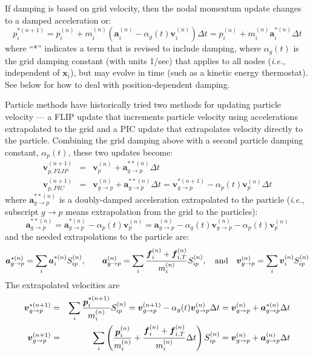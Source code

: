 \documentclass[11pt]{article}
\renewcommand{\vec}[1]{\boldsymbol{#1}}
\begin{document}
If damping is based on grid velocity, then the nodal momentum update changes to a damped acceleration or:
\begin{equation}
     p_i^{*(n+1)} = p_i^{(n)} +  m_i^{(n)}(\vec a_i^{(n)}-\alpha_g(t)\vec v_i^{(n)})\Delta t = p_i^{(n)} +  m_i^{(n)}\vec a_i^{*(n)}\Delta t
\end{equation}
where ``*'' indicates a term that is revised to include damping,
where $\alpha_g(t)$ is the grid damping constant (with units 1/sec) that applies to all nodes (\emph{i.e.}, independent of $\vec x_i$), but may evolve in time (such as a kinetic energy thermostat). See below for how to deal with position-dependent damping.

Particle methods have historically tried two methods for updating particle velocity --- a FLIP update that increments particle velocity using accelerations extrapolated to the grid and a PIC update that extrapolates velocity directly to the particle. Combining the grid damping above with a second particle damping constant, $\alpha_p(t)$, these two updates become:
\begin{eqnarray}
      \vec{v}_{p,FLIP}^{(n+1)}  & = & \vec{v}_p^{(n)} + \vec{a}_{g\to p}^{**(n)} \Delta t   \\
      \vec{v}_{p,PIC}^{(n+1)}  & = &  \vec v_{g\to p}^{(n)} + \vec{a}_{g\to p}^{**(n)} \Delta t 
         = \vec v_{g\to p}^{*(n+1)} - \alpha_p(t)\vec{v}_p^{(n)}\Delta t
\end{eqnarray}
where $\vec{a}_{g\to p}^{**(n)}$ is a doubly-damped acceleration extrapolated to the particle (\emph{i.e.}, subscript $g\to p$ means extrapolation from the grid to the particles):
\begin{equation}
    \vec{a}_{g\to p}^{**(n)} = \vec{a}_{g\to p}^{*(n)} -  \alpha_p(t)\vec{v}_p^{(n)}
    =  \vec{a}_{g\to p}^{(n)} -  \alpha_g(t)\vec v_{g\to p}^{(n)}    -  \alpha_p(t)\vec{v}_p^{(n)} 
\end{equation}
and the needed extrapolations to the particle are:
\begin{equation}
    \vec{a}_{g\to p}^{*(n)} = \sum_i  \vec a_i^{*(n)} S_{ip}^{(n)},   \qquad
    \vec{a}_{g\to p}^{(n)} = \sum_i { \vec f_{i}^{(n)} + \vec f_{i,T}^{(n)} \over m_i^{(n)}} S_{ip}^{(n)}  , 
    \quad {\rm and}\quad \vec v_{g\to p}^{(n)} = \sum_i  \vec v_i^{(n)} S_{ip}^{(n)}
\end{equation}
The extrapolated velocities are
\begin{eqnarray}
      \vec v_{g\to p}^{*(n+1)} & = & \sum_i  {\vec p_i^{*(n+1)} \over m_i^{(n)}}S_{ip}^{(n)}
       = \vec v_{g\to p}^{(n+1)} - \alpha_g(t)\vec v_{g\to p}^{(n)}\Delta t  = \vec v_{g\to p}^{(n)} + \vec{a}_{g\to p}^{*(n)}\Delta t  \\ 
       \vec v_{g\to p}^{(n+1)} & = & 
          \sum_i  \left({\vec p_i^{(n)} \over m_i^{(n)}}+{ \vec f_{i}^{(n)} + \vec f_{i,T}^{(n)} \over m_i^{(n)}}\Delta t\right) S_{ip}^{(n)} 
          = \vec v_{g\to p}^{(n)} + \vec{a}_{g\to p}^{(n)}\Delta t  \label{vgpJump}
\end{eqnarray}
\end{document}
